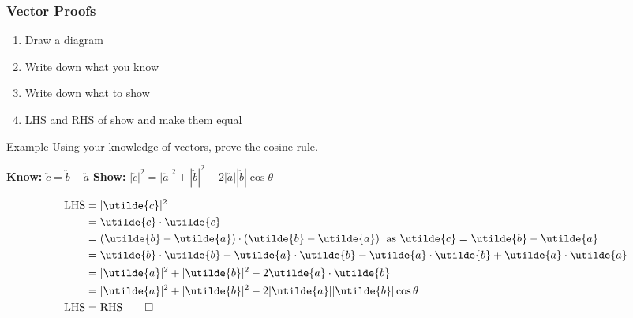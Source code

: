 \documentclass[a4paper]{article}
\begin{document}
			\subsubsection{Vector Proofs}
				\begin{enumerate}
					\item Draw a diagram
					\item Write down what you know
					\item Write down what to show
					\item LHS and RHS of show and make them equal
				\end{enumerate}
				\underline{Example}\newline
				Using your knowledge of vectors, prove the cosine rule.\newline
				\begin{minipage}{0.5\textwidth}
					\textbf{Know:} $\utilde{c}=\utilde{b}-\utilde{a}$\newline
					\textbf{Show:} $|\utilde{c}|^2=|\utilde{a}|^2+|\utilde{b}|^2-2|\utilde{a}||\utilde{b}|\cos\theta$\newline
				\end{minipage}
				\hfill
				\begin{minipage}{0.5\textwidth}
					\begin{flushright}
					\end{flushright}
				\end{minipage}
				\begin{align*}
					\text{LHS}&=|\utilde{c}|^2 \\
					&=\utilde{c}\cdot\utilde{c} \\
					&=(\utilde{b}-\utilde{a})\cdot(\utilde{b}-\utilde{a})\;\text{ as }\utilde{c}=\utilde{b}-\utilde{a} \\
					&=\utilde{b}\cdot\utilde{b}-\utilde{a}\cdot\utilde{b}-\utilde{a}\cdot\utilde{b}+\utilde{a}\cdot\utilde{a} \\
					&=|\utilde{a}|^2+|\utilde{b}|^2-2\utilde{a}\cdot\utilde{b} \\
					&=|\utilde{a}|^2+|\utilde{b}|^2-2|\utilde{a}||\utilde{b}|\cos\theta \\
					\text{LHS}&=\text{RHS}\qed
				\end{align*}
\end{document}
